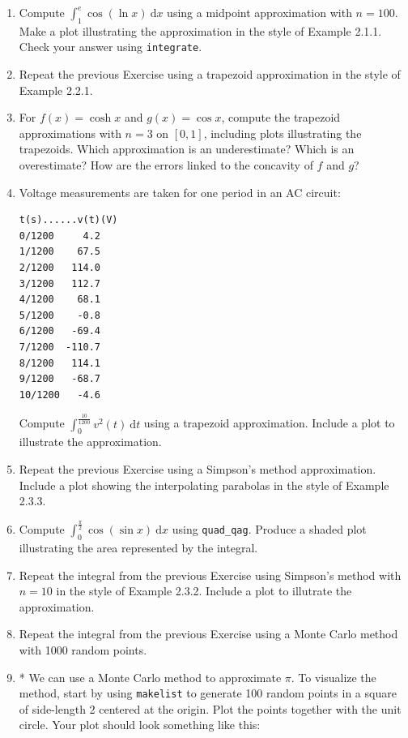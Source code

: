 \documentclass[10.5pt,twoside]{report}
\theoremstyle{definition}
\begin{document}
\begin{enumerate}

\item Compute $\displaystyle \int_1^e \cos{(\ln{x})}\ \mathrm{d}x$ using a midpoint approximation with $n=100$.  Make a plot illustrating the approximation in the style of Example 2.1.1.  Check your answer using \verb|integrate|.

\item  Repeat the previous Exercise using a trapezoid approximation in the style of Example 2.2.1.

\item  For $f(x)=\cosh{x}$ and $g(x)=\cos{x}$, compute the trapezoid approximations with $n=3$ on $[0,1]$, including plots illustrating the trapezoids.  Which approximation is an underestimate?  Which is an overestimate?  How are the errors linked to the concavity of $f$ and $g$?

\item  Voltage measurements are taken for one period in an AC circuit:

\begin{verbatim}
t(s)......v(t)(V)
0/1200     4.2
1/1200    67.5
2/1200   114.0
3/1200   112.7
4/1200    68.1
5/1200    -0.8
6/1200   -69.4
7/1200  -110.7
8/1200   114.1
9/1200   -68.7
10/1200   -4.6
\end{verbatim}

Compute $\displaystyle \int_0^{\frac{10}{1200}} v^2{(t)}\ \mathrm{d}t$ using a trapezoid approximation. Include a plot to illustrate the approximation.

\item  Repeat the previous Exercise using a Simpson's method approximation.  Include a plot showing the interpolating parabolas in the style of Example 2.3.3.

\item  Compute $\displaystyle \int_0^{\frac{\pi}{2}} \cos{(\sin{x})}\ \mathrm{d}x$ using \verb|quad_qag|.  Produce a shaded plot illustrating the area represented by the integral.

\item Repeat the integral from the previous Exercise using Simpson's method with $n=10$ in the style of Example 2.3.2.  Include a plot to illutrate the approximation.

\item  Repeat the integral from the previous Exercise using a Monte Carlo method with 1000 random points.
\pagebreak

\item  * We can use a Monte Carlo method to approximate $\pi$.  To visualize the method, start by using \verb|makelist| to generate 100 random points in a square of side-length 2 centered at the origin.  Plot the points together with the unit circle. Your plot should look something like this:\\


\end{enumerate}
\end{document}
